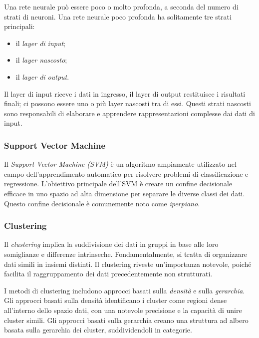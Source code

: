 Una rete neurale può essere poco o molto profonda, a seconda del numero di strati di neuroni. Una rete neurale poco profonda ha solitamente tre strati principali: 

\begin{itemize}
    \item il \textit{layer di input};
    \item il \textit{layer nascosto};
    \item il \textit{layer di output}.
\end{itemize}

Il layer di input riceve i dati in ingresso, il layer di output restituisce i risultati finali; ci possono essere uno o più layer nascosti tra di essi. Questi strati nascosti sono responsabili di elaborare e apprendere rappresentazioni complesse dai dati di input.

\subsubsection{Support Vector Machine}

Il \textit{Support Vector Machine (SVM)} è un algoritmo ampiamente utilizzato nel campo dell'apprendimento automatico per risolvere problemi di classificazione e regressione. L'obiettivo principale dell'SVM è creare un confine decisionale efficace in uno spazio ad alta dimensione per separare le diverse classi dei dati. Questo confine decisionale è comunemente noto come \textit{iperpiano}.

\subsubsection{Clustering}

Il \textit{clustering} implica la suddivisione dei dati in gruppi in base alle loro somiglianze e differenze intrinseche. Fondamentalmente, si tratta di organizzare dati simili in insiemi distinti. Il clustering riveste un'importanza notevole, poiché facilita il raggruppamento dei dati precedentemente non strutturati. 

I metodi di clustering includono approcci basati sulla \textit{densità} e sulla \textit{gerarchia}. Gli approcci basati sulla densità identificano i cluster come regioni dense all'interno dello spazio dati, con una notevole precisione e la capacità di unire cluster simili. Gli approcci basati sulla gerarchia creano una struttura ad albero basata sulla gerarchia dei cluster, suddividendoli in categorie.

